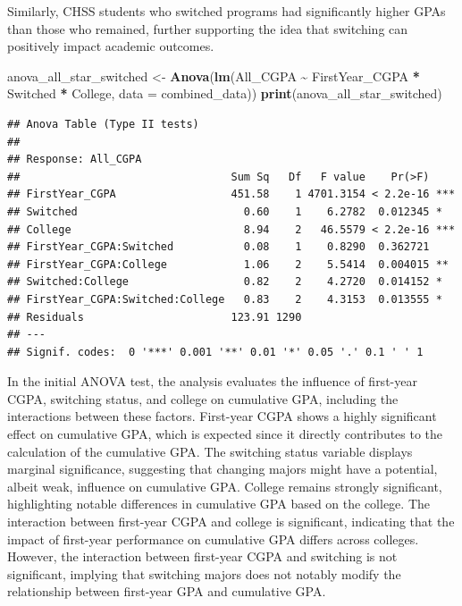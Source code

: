 \documentclass[
  12pt,
]{article}
\newenvironment{Shaded}{\begin{snugshade}}{\end{snugshade}}
\newcommand{\AttributeTok}[1]{\textcolor[rgb]{0.13,0.29,0.53}{#1}}
\newcommand{\FunctionTok}[1]{\textcolor[rgb]{0.13,0.29,0.53}{\textbf{#1}}}
\newcommand{\NormalTok}[1]{#1}
\newcommand{\OtherTok}[1]{\textcolor[rgb]{0.56,0.35,0.01}{#1}}
\newcommand{\SpecialCharTok}[1]{\textcolor[rgb]{0.81,0.36,0.00}{\textbf{#1}}}
\begin{document}
Similarly, CHSS students who switched programs had significantly higher
GPAs than those who remained, further supporting the idea that switching
can positively impact academic outcomes.

\begin{Shaded}
\begin{Highlighting}[]
\NormalTok{anova\_all\_star\_switched }\OtherTok{\textless{}{-}} \FunctionTok{Anova}\NormalTok{(}\FunctionTok{lm}\NormalTok{(All\_CGPA }\SpecialCharTok{\textasciitilde{}}\NormalTok{ FirstYear\_CGPA }\SpecialCharTok{*}\NormalTok{ Switched }\SpecialCharTok{*}\NormalTok{ College,}
    \AttributeTok{data =}\NormalTok{ combined\_data))}
\FunctionTok{print}\NormalTok{(anova\_all\_star\_switched)}
\end{Highlighting}
\end{Shaded}

\begin{verbatim}
## Anova Table (Type II tests)
## 
## Response: All_CGPA
##                                 Sum Sq   Df   F value    Pr(>F)    
## FirstYear_CGPA                  451.58    1 4701.3154 < 2.2e-16 ***
## Switched                          0.60    1    6.2782  0.012345 *  
## College                           8.94    2   46.5579 < 2.2e-16 ***
## FirstYear_CGPA:Switched           0.08    1    0.8290  0.362721    
## FirstYear_CGPA:College            1.06    2    5.5414  0.004015 ** 
## Switched:College                  0.82    2    4.2720  0.014152 *  
## FirstYear_CGPA:Switched:College   0.83    2    4.3153  0.013555 *  
## Residuals                       123.91 1290                        
## ---
## Signif. codes:  0 '***' 0.001 '**' 0.01 '*' 0.05 '.' 0.1 ' ' 1
\end{verbatim}

In the initial ANOVA test, the analysis evaluates the influence of
first-year CGPA, switching status, and college on cumulative GPA,
including the interactions between these factors. First-year CGPA shows
a highly significant effect on cumulative GPA, which is expected since
it directly contributes to the calculation of the cumulative GPA. The
switching status variable displays marginal significance, suggesting
that changing majors might have a potential, albeit weak, influence on
cumulative GPA. College remains strongly significant, highlighting
notable differences in cumulative GPA based on the college. The
interaction between first-year CGPA and college is significant,
indicating that the impact of first-year performance on cumulative GPA
differs across colleges. However, the interaction between first-year
CGPA and switching is not significant, implying that switching majors
does not notably modify the relationship between first-year GPA and
cumulative GPA.
\end{document}
